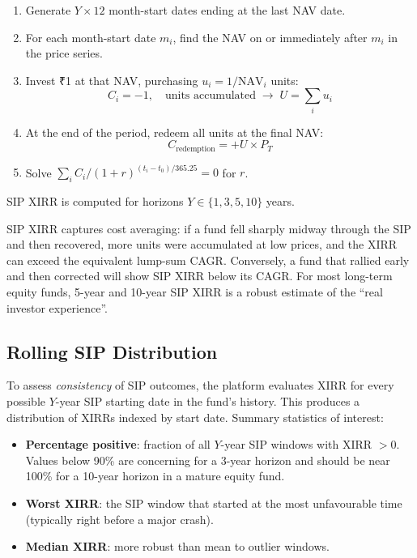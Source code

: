 \documentclass[12pt, a4paper]{article}
\newcommand{\NAV}{\mathrm{NAV}}
\begin{document}
\begin{enumerate}[label=\arabic*.]
  \item Generate $Y \times 12$ month-start dates ending at the last NAV date.
  \item For each month-start date $m_i$, find the NAV on or immediately after
    $m_i$ in the price series.
  \item Invest ₹1 at that NAV, purchasing $u_i = 1/\NAV_i$ units:
    \[
      C_i = -1, \quad \text{units accumulated} \;\to\; U = \sum_i u_i
    \]
  \item At the end of the period, redeem all units at the final NAV:
    \[
      C_{\text{redemption}} = +U \times P_T
    \]
  \item Solve $\sum_i C_i/(1+r)^{(t_i-t_0)/365.25} = 0$ for $r$.
\end{enumerate}

SIP XIRR is computed for horizons $Y \in \{1, 3, 5, 10\}$ years.

\begin{interpretation}
SIP XIRR captures cost averaging: if a fund fell sharply midway through
the SIP and then recovered, more units were accumulated at low prices,
and the XIRR can exceed the equivalent lump-sum CAGR.  Conversely, a
fund that rallied early and then corrected will show SIP XIRR below
its CAGR.  For most long-term equity funds, 5-year and 10-year SIP
XIRR is a robust estimate of the ``real investor experience''.
\end{interpretation}

\subsection{Rolling SIP Distribution}

To assess \emph{consistency} of SIP outcomes, the platform evaluates XIRR
for every possible $Y$-year SIP starting date in the fund's history.
This produces a distribution of XIRRs indexed by start date.  Summary
statistics of interest:

\begin{itemize}
  \item \textbf{Percentage positive}: fraction of all $Y$-year SIP windows
    with XIRR $> 0$.  Values below 90\% are concerning for a 3-year
    horizon and should be near 100\% for a 10-year horizon in a mature
    equity fund.
  \item \textbf{Worst XIRR}: the SIP window that started at the most
    unfavourable time (typically right before a major crash).
  \item \textbf{Median XIRR}: more robust than mean to outlier windows.
\end{itemize}
\end{document}
